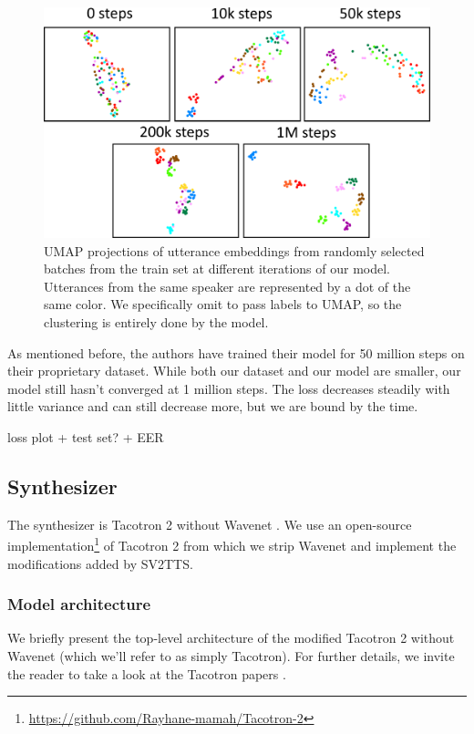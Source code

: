 \documentclass[a4paper, oneside, 12pt, english]{article}
\begin{document}
\begin{figure}[h]
	\centering
	\includegraphics[width=\linewidth]{images/training_umap.png}
	\caption{UMAP projections of utterance embeddings from randomly selected batches from the train set at different iterations of our model. Utterances from the same speaker are represented by a dot of the same color. We specifically omit to pass labels to UMAP, so the clustering is entirely done by the model.}
	\label{training_umap}
\end{figure}

As mentioned before, the authors have trained their model for 50 million steps on their proprietary dataset. While both our dataset and our model are smaller, our model still hasn't converged at 1 million steps. The loss decreases steadily with little variance and can still decrease more, but we are bound by the time.

\color{red} loss plot + test set? + EER \color{black}



\subsection{Synthesizer} \label{synthesizer}
The synthesizer is Tacotron 2 without Wavenet \citep{WaveNet}. We use an open-source implementation\footnote{\url{https://github.com/Rayhane-mamah/Tacotron-2}} of Tacotron 2 from which we strip Wavenet and implement the modifications added by SV2TTS.

\subsubsection{Model architecture}
We briefly present the top-level architecture of the modified Tacotron 2 without Wavenet (which we'll refer to as simply Tacotron). For further details, we invite the reader to take a look at the Tacotron papers \citep{Tacotron2, Tacotron1}.
\end{document}

